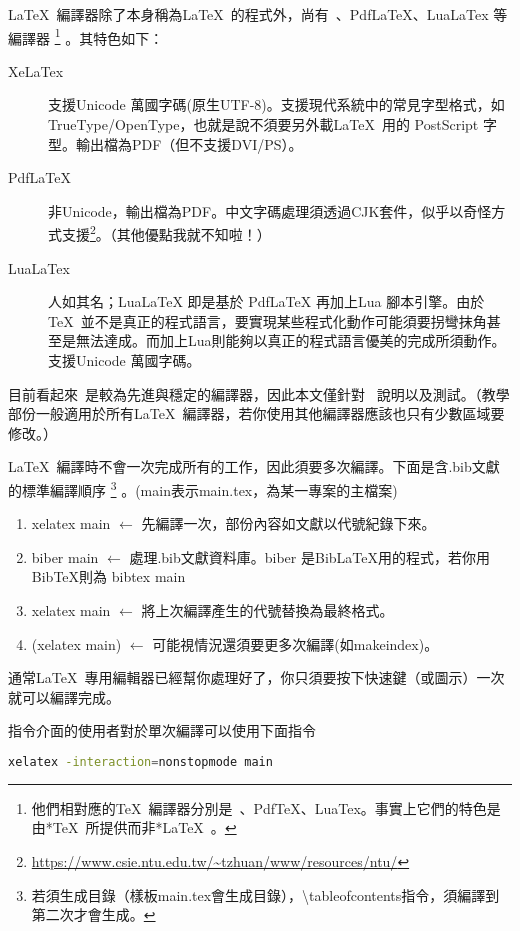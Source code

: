 \documentclass[class=NCU_thesis, crop=false, float=true]{standalone}
\begin{document}
\LaTeX\  編譯器除了本身稱為\LaTeX\ 的程式外，尚有\XeLaTeX\ 、PdfLaTeX、LuaLaTex 等編譯器
\footnote{他們相對應的\TeX\ 編譯器分別是\XeTeX\ 、PdfTeX、LuaTex。事實上它們的特色是由*\TeX\  所提供而非*\LaTeX\ 。}
。其特色如下：
\begin{description}
    \item[XeLaTex]  支援Unicode 萬國字碼(原生UTF-8)。支援現代系統中的常見字型格式，如TrueType/OpenType，也就是說不須要另外載\LaTeX\  用的 PostScript 字型。輸出檔為PDF（但不支援DVI/PS）。
    \item[PdfLaTeX] 非Unicode，輸出檔為PDF。中文字碼處理須透過CJK套件，似乎以奇怪方式支援\footnote{\url{https://www.csie.ntu.edu.tw/~tzhuan/www/resources/ntu/}}。（其他優點我就不知啦！）
    \item[LuaLaTex] 人如其名；LuaLaTeX 即是基於 PdfLaTeX 再加上Lua 腳本引擎。由於 \TeX\  並不是真正的程式語言，要實現某些程式化動作可能須要拐彎抹角甚至是無法達成。而加上Lua則能夠以真正的程式語言優美的完成所須動作。支援Unicode 萬國字碼。
\end{description}
目前看起來\XeLaTeX\ 是較為先進與穩定的編譯器，因此本文僅針對 \XeLaTeX\  說明以及測試。（教學部份一般適用於所有\LaTeX\  編譯器，若你使用其他編譯器應該也只有少數區域要修改。）

\LaTeX\ 編譯時不會一次完成所有的工作，因此須要多次編譯。下面是含.bib文獻的標準編譯順序
\footnote{若須生成目錄（樣板main.tex會生成目錄），\textbackslash{}tableofcontents指令，須編譯到第二次才會生成。}
。(main表示main.tex，為某一專案的主檔案)
\begin{enumerate}
	\item xelatex main   $\longleftarrow$ 先編譯一次，部份內容如文獻以代號紀錄下來。
	\item biber main     $\longleftarrow$ 處理.bib文獻資料庫。biber 是BibLaTeX用的程式，若你用BibTeX則為 bibtex main
	\item xelatex main   $\longleftarrow$ 將上次編譯產生的代號替換為最終格式。
	\item (xelatex main) $\longleftarrow$ 可能視情況還須要更多次編譯(如makeindex)。
\end{enumerate}
通常\LaTeX\ 專用編輯器已經幫你處理好了，你只須要按下快速鍵（或圖示）一次就可以編譯完成。

指令介面的使用者對於單次編譯可以使用下面指令
\begin{lstlisting}[style=consoleStyle,language=bash]
xelatex -interaction=nonstopmode main
\end{lstlisting}
\end{document}
